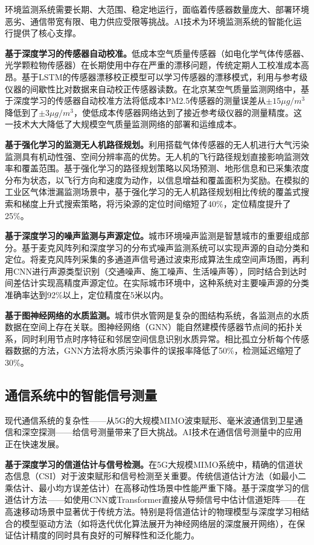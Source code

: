 \documentclass[12pt,a4paper]{article}
\numberwithin{figure}{section}
\numberwithin{table}{section}
\numberwithin{equation}{section}
\begin{document}
环境监测系统需要长期、大范围、稳定地运行，面临着传感器数量庞大、部署环境恶劣、通信带宽有限、电力供应受限等挑战。AI技术为环境监测系统的智能化运行提供了核心支撑。

\textbf{基于深度学习的传感器自动校准。}低成本空气质量传感器（如电化学气体传感器、光学颗粒物传感器）在长期使用中存在严重的漂移问题，传统定期人工校准成本高昂。基于LSTM的传感器漂移校正模型可以学习传感器的漂移模式，利用与参考级仪器的间歇性比对数据来自动校正传感器读数。在北京某空气质量监测网络中，基于深度学习的传感器自动校准方法将低成本PM2.5传感器的测量误差从$\pm15\mu g/m^3$降低到了$\pm3\mu g/m^3$，使低成本传感器网络达到了接近参考级仪器的测量精度。这一技术大大降低了大规模空气质量监测网络的部署和运维成本。

\textbf{基于强化学习的监测无人机路径规划。}利用搭载气体传感器的无人机进行大气污染监测具有机动性强、空间分辨率高的优势。无人机的飞行路径规划直接影响监测效率和覆盖范围。基于强化学习的路径规划策略以风场预测、地形信息和已采集浓度分布为状态，以飞行方向和速度为动作，以信息增益和覆盖面积为奖励。在模拟的工业区气体泄漏监测场景中，基于强化学习的无人机路径规划相比传统的覆盖式搜索和梯度上升式搜索策略，将污染源的定位时间缩短了40\%，定位精度提升了25\%。

\textbf{基于深度学习的噪声监测与声源定位。}城市环境噪声监测是智慧城市的重要组成部分。基于麦克风阵列和深度学习的分布式噪声监测系统可以实现声源的自动分类和定位。将麦克风阵列采集的多通道声信号通过波束形成算法生成空间声场图，再利用CNN进行声源类型识别（交通噪声、施工噪声、生活噪声等），同时结合到达时间差估计实现高精度声源定位。在实际城市环境中，这种系统对主要噪声源的分类准确率达到92\%以上，定位精度在5米以内。

\textbf{基于图神经网络的水质监测。}城市供水管网是复杂的图结构系统，各监测点的水质数据在空间上存在关联。图神经网络（GNN）能自然建模传感器节点间的拓扑关系，同时利用节点时序特征和邻居空间信息识别水质异常。相比孤立分析每个传感器数据的方法，GNN方法将水质污染事件的误报率降低了50\%，检测延迟缩短了30\%。

\subsection{通信系统中的智能信号测量}

现代通信系统的复杂性——从5G的大规模MIMO波束赋形、毫米波通信到卫星通信和深空探测——给信号测量带来了巨大挑战。AI技术在通信信号测量中的应用正在快速发展。

\textbf{基于深度学习的信道估计与信号检测。}在5G大规模MIMO系统中，精确的信道状态信息（CSI）对于波束赋形和信号检测至关重要。传统信道估计方法（如最小二乘估计、最小均方误差估计）在高移动性场景中性能严重下降。基于深度学习的信道估计方法——如使用CNN或Transformer直接从导频信号中估计信道矩阵——在高速移动场景中显著优于传统方法。特别是将信道估计的物理模型与深度学习相结合的模型驱动方法（如将迭代优化算法展开为神经网络层的深度展开网络），在保证估计精度的同时具有良好的可解释性和泛化能力。
\end{document}
